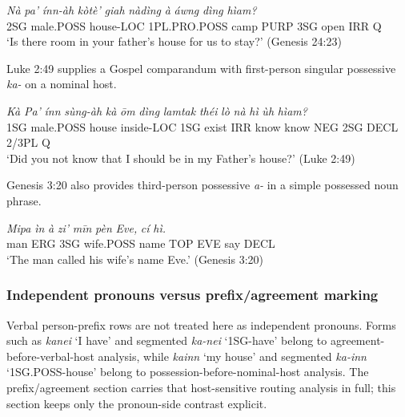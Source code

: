 \documentclass[
  11pt,
  a4paper,
]{article}
\newcommand{\tdim}[1]{\textit{#1}}
\newcommand{\tdimword}[1]{\textit{#1}}
\renewcommand{\textsc}[1]{{\footnotesize\MakeUppercase{#1}}}
\newcommand{\glossquote}[1]{`#1'}
\begin{document}
\begin{exe}
\ex \label{ex:poss-na}
\gll \tdimword{Nà} \tdimword{pa'} \tdimword{ínn-àh} \tdimword{kòtè'} \tdimword{giah} \tdimword{nàdìng} \tdimword{à} \tdimword{áwng} \tdimword{dìng} \tdimword{hìam?} \\
     \textsc{2sg} male.\textsc{poss} house-\textsc{loc} \textsc{1pl}.\textsc{pro}.\textsc{poss} camp \textsc{purp} \textsc{3sg} open \textsc{irr} \textsc{q} \\
\glt \glossquote{Is there room in your father's house for us to stay?} (Genesis 24:23)
\end{exe}

Luke 2:49 supplies a Gospel comparandum with first-person singular
possessive \tdim{ka-} on a nominal host.

\begin{exe}
\ex \label{ex:poss-ka-pa-inn}
\gll \tdimword{Kà} \tdimword{Pa'} \tdimword{ínn} \tdimword{sùng-àh} \tdimword{kà} \tdimword{ōm} \tdimword{dìng} \tdimword{lamtak} \tdimword{théi} \tdimword{lò} \tdimword{nà} \tdimword{hì} \tdimword{ùh} \tdimword{hìam?} \\
     \textsc{1sg} male.\textsc{poss} house inside-\textsc{loc} \textsc{1sg} exist \textsc{irr} know know \textsc{neg} \textsc{2sg} \textsc{decl} 2/3PL \textsc{q} \\
\glt \glossquote{Did you not know that I should be in my Father's house?} (Luke 2:49)
\end{exe}

Genesis 3:20 also provides third-person possessive \tdim{a-} in a simple
possessed noun phrase.

\begin{exe}
\ex \label{ex:poss-a}
\gll \tdimword{Mipa} \tdimword{ìn} \tdimword{à} \tdimword{zi'} \tdimword{mīn} \tdimword{pèn} \tdimword{Eve,} \tdimword{cí} \tdimword{hì.} \\
     man \textsc{erg} \textsc{3sg} wife.\textsc{poss} name \textsc{top} \textsc{eve} say \textsc{decl} \\
\glt \glossquote{The man called his wife's name Eve.} (Genesis 3:20)
\end{exe}

\subsubsection{Independent pronouns versus prefix/agreement
marking}\label{independent-pronouns-versus-prefixagreement-marking}

Verbal person-prefix rows are not treated here as independent pronouns.
Forms such as \tdim{kanei} \glossquote{I have} and segmented
\tdim{ka-nei} \glossquote{1SG-have} belong to
agreement-before-verbal-host analysis, while \tdim{kainn}
\glossquote{my house} and segmented \tdim{ka-inn}
\glossquote{1SG.POSS-house} belong to possession-before-nominal-host
analysis. The prefix/agreement section carries that host-sensitive
routing analysis in full; this section keeps only the pronoun-side
contrast explicit.
\end{document}
